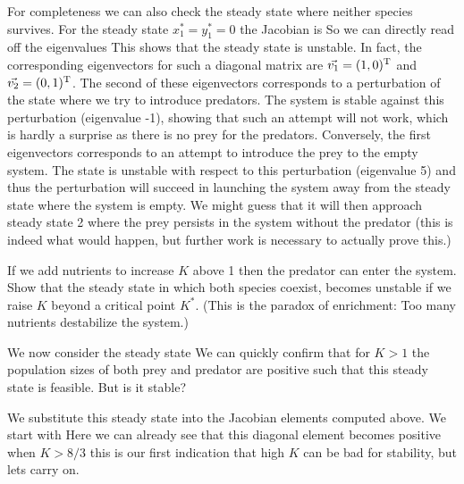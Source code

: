 For completeness we can also check the steady state where neither species survives. For the steady state $x_1^*=y_1^*=0$ the Jacobian is    
So we can directly read off the eigenvalues 
This shows that the steady state is unstable. In fact, the corresponding eigenvectors for such a diagonal matrix are $\vec{v_1}=(1,0)^{\rm T}$ and $\vec{v_2}=(0,1)^{\rm T}$. The second of these eigenvectors corresponds to a perturbation of the state where we try to introduce predators. The system is stable against this perturbation (eigenvalue -1), showing that such an attempt will not work, which is hardly a surprise as there is no prey for the predators. Conversely, the first eigenvectors corresponds to an attempt to introduce the prey to the empty system. The state is unstable with respect to this perturbation (eigenvalue 5) and thus the perturbation will succeed in launching the system away from the steady state where the system is empty. We might guess that it will then approach steady state 2 where the prey persists in the system without the predator (this is indeed what would happen, but further work is necessary to actually prove this.)

\subquestion
If we add nutrients to increase $K$ above 1 then the predator can enter the system. Show that the steady state in which both species coexist, becomes unstable if we raise $K$ beyond a critical point $K^*$. (This is the paradox of enrichment: Too many nutrients destabilize the system.) 

\solution 
We now consider the steady state 
We can quickly confirm that for $K>1$ the population sizes of both prey and predator are positive such that this steady state is feasible. 
But is it stable?

We substitute this steady state into the Jacobian elements computed above. We start with 
Here we can already see that this diagonal element becomes positive when 
$K>8/3$ this is our first indication that high $K$ can be bad for stability, but lets carry on. 

